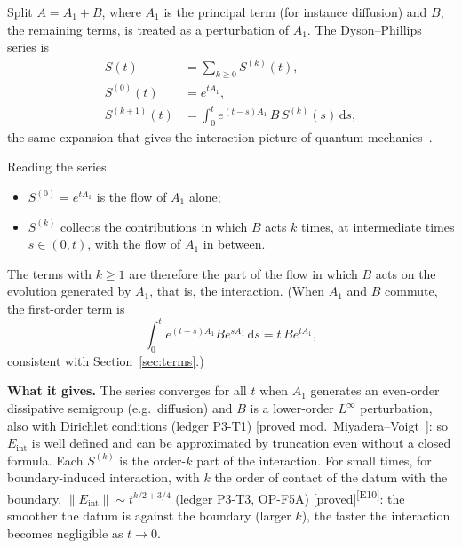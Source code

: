 \documentclass[11pt,a4paper]{article}
\theoremstyle{definition}
\newcommand{\badge}[2]{\textcolor{#1}{\textsf{\footnotesize[#2]}}}
\newcommand{\proved}[1][]{\badge{cC}{proved#1}}
\newcommand{\modulo}[1]{\badge{cD}{proved mod.\ #1}}
\newcommand{\led}[1]{\textcolor{cG}{\textsf{\footnotesize(ledger #1)}}}
\newcommand{\edmark}[1]{\textsuperscript{\textcolor{cB}{\textsf{[#1]}}}}
\newcommand{\Eint}{E_{\mathrm{int}}}
\newcommand{\dd}{\,\mathrm{d}}
\begin{document}
Split $A=A_1+B$, where $A_1$ is the principal term (for instance diffusion) and $B$, the remaining terms, is treated as a perturbation of $A_1$. The Dyson--Phillips series is
\begin{equation}\label{eq:dyson}
\begin{aligned}
S(t)&=\sum_{k\ge0}S^{(k)}(t),\\
S^{(0)}(t)&=e^{tA_1},\\
S^{(k+1)}(t)&=\int_0^te^{(t-s)A_1}\,B\,S^{(k)}(s)\dd s ,
\end{aligned}
\end{equation}
the same expansion that gives the interaction picture of quantum mechanics~\cite{dy}.

\begin{aside}{Reading the series}
\begin{itemize}[nosep]
\item $S^{(0)}=e^{tA_1}$ is the flow of $A_1$ alone;
\item $S^{(k)}$ collects the contributions in which $B$ acts $k$ times, at intermediate times $s\in(0,t)$, with the flow of $A_1$ in between.
\end{itemize}
The terms with $k\ge1$ are therefore the part of the flow in which $B$ acts on the evolution generated by $A_1$, that is, the interaction. (When $A_1$ and $B$ commute, the first-order term is
\[
\int_0^te^{(t-s)A_1}Be^{sA_1}\dd s=t\,Be^{tA_1},
\]
consistent with Section~\ref{sec:terms}.)
\end{aside}

\textbf{What it gives.} The series converges for all $t$ when $A_1$ generates an even-order dissipative semigroup (e.g.\ diffusion) and $B$ is a lower-order $L^\infty$ perturbation, also with Dirichlet conditions \led{P3-T1} \modulo{Miyadera--Voigt~\cite{en}}: so $\Eint$ is well defined and can be approximated by truncation even without a closed formula. Each $S^{(k)}$ is the order-$k$ part of the interaction. For small times, for boundary-induced interaction, with $k$ the order of contact of the datum with the boundary, $\|\Eint\|\sim t^{k/2+3/4}$ \led{P3-T3, OP-F5A} \proved\edmark{E10}: the smoother the datum is against the boundary (larger $k$), the faster the interaction becomes negligible as $t\to0$.
\end{document}
